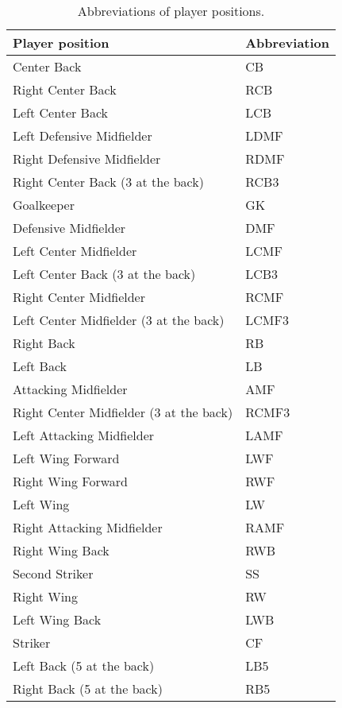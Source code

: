 \begin{table}[!htbp]
\centering
\caption{
\label{tab:positionPass}Abbreviations of player positions.
}\s
\begin{tabular}{@{}ll}
\hline
Player position                         & Abbreviation \\
\hline
Center Back                             & CB                   \\
Right Center Back                       & RCB                \\
Left Center Back                        & LCB                   \\
Left Defensive Midfielder               & LDMF                   \\
Right Defensive Midfielder              & RDMF                  \\
Right Center Back (3 at the back)       & RCB3                  \\
Goalkeeper                              & GK                 \\
Defensive Midfielder                    & DMF                  \\
Left Center Midfielder                  & LCMF                  \\
Left Center Back (3 at the back)        & LCB3                  \\
Right Center Midfielder                 & RCMF                  \\
Left Center Midfielder (3 at the back)  & LCMF3                   \\
Right Back                              & RB                   \\
Left Back                               & LB                  \\
Attacking Midfielder                    & AMF                   \\
Right Center Midfielder (3 at the back) & RCMF3                  \\
Left Attacking Midfielder               & LAMF                 \\
Left Wing Forward                       & LWF                  \\
Right Wing Forward                      & RWF                  \\
Left Wing                               & LW                   \\
Right Attacking Midfielder              & RAMF                   \\
Right Wing Back                         & RWB                   \\
Second Striker                          & SS                   \\
Right Wing                              & RW                  \\
Left Wing Back                          & LWB                  \\
Striker                          & CF                   \\
Left Back (5 at the back)               & LB5                 \\
Right Back (5 at the back)              & RB5         \\
\hline
\end{tabular}

\end{table}
